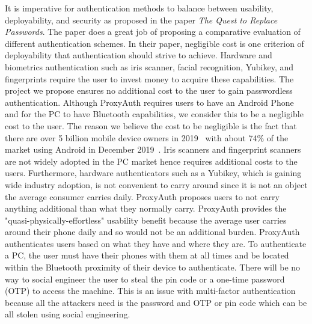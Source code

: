 \documentclass[letterpaper,twocolumn,10pt]{article}
\begin{document}
It is imperative for authentication methods to balance between usability, deployability, and security as proposed in the paper \emph{The Quest to Replace Passwords}. The paper does a great job of proposing a comparative evaluation of different authentication schemes. In their paper, negligible cost is one criterion of deployability that authentication should strive to achieve. Hardware and biometrics authentication such as iris scanner, facial recognition, Yubikey, and fingerprints require the user to invest money to acquire these capabilities. The project we propose ensures no additional cost to the user to gain passwordless authentication. Although ProxyAuth requires users to have an Android Phone and for the PC to have Bluetooth capabilities, we consider this to be a negligible cost to the user. The reason we believe the cost to be negligible is the fact that there are over 5 billion mobile device owners in 2019~\cite{smartphone_ownership} with about 74\% of the market using Android in December 2019~\cite{stats_mobileos_marketshare}. Iris scanners and fingerprint scanners are not widely adopted in the PC market hence requires additional costs to the users. Furthermore, hardware authenticators such as a Yubikey, which is gaining wide industry adoption, is not convenient to carry around since it is not an object the average consumer carries daily. ProxyAuth proposes users to not carry anything additional than what they normally carry. ProxyAuth provides the "quasi-physically-effortless" usability benefit because the average user carries around their phone daily and so would not be an additional burden. ProxyAuth authenticates users based on what they have and where they are. To authenticate a PC, the user must have their phones with them at all times and be located within the Bluetooth proximity of their device to authenticate. There will be no way to social engineer the user to steal the pin code or a one-time password (OTP) to access the machine. This is an issue with multi-factor authentication because all the attackers need is the password and OTP or pin code which can be all stolen using social engineering. 
\end{document}
